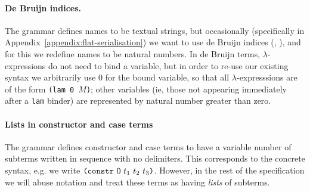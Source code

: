 \paragraph{De Bruijn indices.}
The grammar defines names to be textual strings, but occasionally (specifically
in Appendix~\ref{appendix:flat-serialisation}) we want to use de Bruijn indices
(\cite{deBruijn}, \cite[C.3]{Barendregt}), and for this we redefine names to be
natural numbers.  In de Bruijn terms, $\lambda$-expressions do not need to bind
a variable, but in order to re-use our existing syntax we arbitrarily use 0 for
the bound variable, so that all $\lambda$-expresssions are of the form
\texttt{(lam 0 $M$)}; other variables (ie, those not appearing immediately after
a \texttt{lam} binder) are represented by natural number greater than zero.

\paragraph{Lists in constructor and case terms}
The grammar defines constructor and case terms to have a variable number of
subterms written in sequence with no delimiters. This corresponds to the
concrete syntax, e.g. we write $\texttt{(} \texttt{constr} ~ 0 ~ t_1\ t_2\ t_3 \texttt{)}$. However, in the
rest of the specification we will abuse notation and treat these terms as
having \emph{lists} of subterms.
